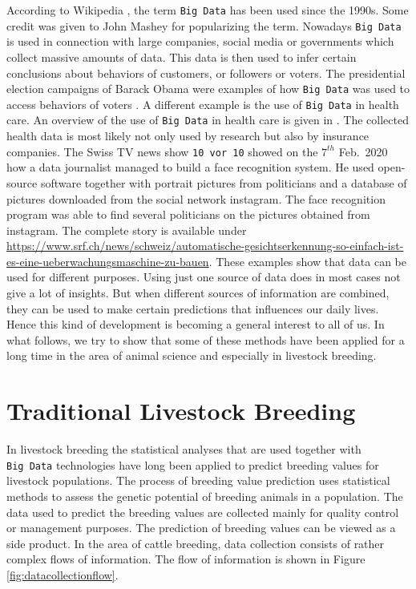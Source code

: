 \documentclass[]{book}
\theoremstyle{definition}
\theoremstyle{definition}
\theoremstyle{definition}
\theoremstyle{remark}
\begin{document}
According to Wikipedia \citep{Wikipedia2019}, the term \texttt{Big\ Data} has been used since the 1990s. Some credit was given to John Mashey \citep{Mashey1998} for popularizing the term. Nowadays \texttt{Big\ Data} is used in connection with large companies, social media or governments which collect massive amounts of data. This data is then used to infer certain conclusions about behaviors of customers, or followers or voters. The presidential election campaigns of Barack Obama were examples of how \texttt{Big\ Data} was used to access behaviors of voters \citep{Issenberg2013}. A different example is the use of \texttt{Big\ Data} in health care. An overview of the use of \texttt{Big\ Data} in health care is given in \citep{Adibuzzaman2017}. The collected health data is most likely not only used by research but also by insurance companies. The Swiss TV news show \texttt{10\ vor\ 10} showed on the \(7^{th}\) Feb.~2020 how a data journalist managed to build a face recognition system. He used open-source software together with portrait pictures from politicians and a database of pictures downloaded from the social network instagram. The face recognition program was able to find several politicians on the pictures obtained from instagram. The complete story is available under \url{https://www.srf.ch/news/schweiz/automatische-gesichtserkennung-so-einfach-ist-es-eine-ueberwachungsmaschine-zu-bauen}. These examples show that data can be used for different purposes. Using just one source of data does in most cases not give a lot of insights. But when different sources of information are combined, they can be used to make certain predictions that influences our daily lives. Hence this kind of development is becoming a general interest to all of us. In what follows, we try to show that some of these methods have been applied for a long time in the area of animal science and especially in livestock breeding.

\hypertarget{asm-traditional-animal-breeding}{%
\section{Traditional Livestock Breeding}\label{asm-traditional-animal-breeding}}

In livestock breeding the statistical analyses that are used together with \texttt{Big\ Data} technologies have long been applied to predict breeding values for livestock populations. The process of breeding value prediction uses statistical methods to assess the genetic potential of breeding animals in a population. The data used to predict the breeding values are collected mainly for quality control or management purposes. The prediction of breeding values can be viewed as a side product. In the area of cattle breeding, data collection consists of rather complex flows of information. The flow of information is shown in Figure \ref{fig:datacollectionflow}.
\end{document}
